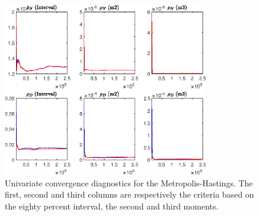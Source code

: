 \begin{figure}[H]
\centering 
\includegraphics[width=0.80\textwidth]{BRS_growth_alt/Output/BRS_growth_alt_udiag3}
\caption{Univariate convergence diagnostics for the Metropolis-Hastings.
The first, second and third columns are respectively the criteria based on
the eighty percent interval, the second and third moments.}\label{Fig:UnivariateDiagnostics:3}
\end{figure}

